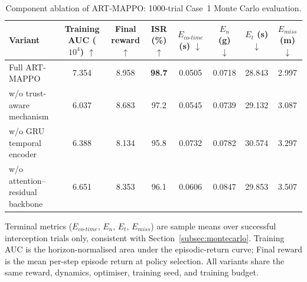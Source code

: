 \begin{table}[!t]
\centering
\color{blue}
\scriptsize
\caption{Component ablation of ART-MAPPO: 1000-trial Case~1 Monte Carlo evaluation.}
\label{tab:ablation_case1}
\renewcommand{\arraystretch}{1.12}
\setlength{\tabcolsep}{3.5pt}
\begin{tabular}{lccccccc}
\toprule
Variant
  & Training AUC ($10^4$) $\uparrow$
  & Final reward $\uparrow$
  & ISR (\%) $\uparrow$
  & $E_{co\text{-}time}$ (s) $\downarrow$
  & $E_n$ (g) $\downarrow$
  & $E_t$ (s) $\downarrow$
  & $E_{miss}$ (m) $\downarrow$ \\
\midrule
Full ART-MAPPO                   & 7.354 & 8.958 & \textbf{98.7} & 0.0505 & 0.0718 & 28.843 & 2.997 \\
w/o trust-aware mechanism        & 6.037 & 8.683 & 97.2          & 0.0545 & 0.0739 & 29.132 & 3.087 \\
w/o GRU temporal encoder         & 6.388 & 8.134 & 95.8          & 0.0732 & 0.0782 & 30.574 & 3.297 \\
w/o attention--residual backbone & 6.651 & 8.353 & 96.1          & 0.0606 & 0.0847 & 29.853 & 3.507 \\
\bottomrule
\end{tabular}
\vspace{1mm}\parbox{0.99\linewidth}{\footnotesize\color{blue}
Terminal metrics ($E_{co\text{-}time}$, $E_n$, $E_t$, $E_{miss}$) are sample means over
successful interception trials only, consistent with Section~\ref{subsec:montecarlo}.
Training AUC is the horizon-normalised area under the episodic-return curve; Final reward
is the mean per-step episode return at policy selection.  All variants share the same
reward, dynamics, optimiser, training seed, and training budget.}
\end{table}
